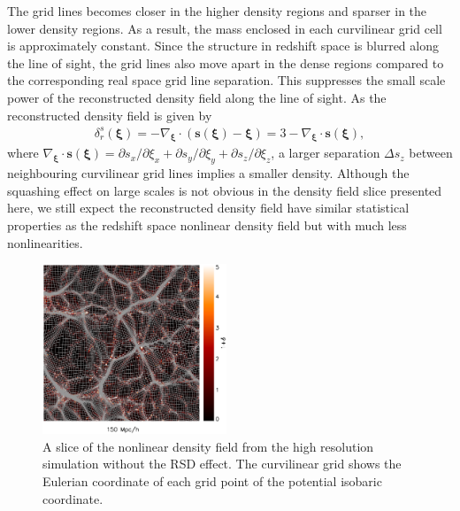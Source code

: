 \documentclass[aps,prx,twocolumn,superscriptaddress,groupedaddress,nofootinbib,amsfont]{revtex4}  %
\newcommand{\bea}{\begin{eqnarray}}
\newcommand{\eea}{\end{eqnarray}}
\newcommand{\bms}{\bm{s}}
\newcommand{\bmxi}{\bm{\xi}}
\begin{document}
The grid lines becomes closer in the higher density regions and sparser in the 
lower density regions. As a result, the mass enclosed in each curvilinear grid 
cell is approximately constant. Since the structure in redshift
space is blurred along the line of sight, the grid lines also move apart in the
dense regions compared to the corresponding real space grid line separation.
This suppresses the small scale power of the reconstructed density field 
along the line of sight.
As the reconstructed density field is given by 
\bea
\delta_r^s(\bmxi)=-\nabla_{\bmxi}\cdot(\bms(\bmxi)-\bmxi)=3-\nabla_{\bmxi}\cdot\bms(\bmxi),
\eea
where $\nabla_{\bmxi}\cdot\bms(\bmxi)=\partial s_x/\partial\xi_x+\partial s_y/\partial\xi_y+\partial s_z/\partial\xi_z$, a larger separation $\Delta s_z$ 
between neighbouring curvilinear grid lines implies a smaller density.
Although the squashing effect on large scales is not obvious in the density
field slice presented here, we still expect the reconstructed density field 
have similar statistical properties as the redshift space nonlinear density 
field but with much less nonlinearities.

\begin{figure}[tbp]
\begin{center}
\includegraphics[width=0.49\textwidth]{map0512-0128_i1500_xz222.eps}
\end{center}
\vspace{-0.7cm}
\caption{A slice of the nonlinear density field from the high resolution 
    simulation without the RSD effect. The curvilinear grid shows the Eulerian
    coordinate of each grid point of the potential isobaric coordinate.}
\label{fig:map}
\end{figure}
\end{document}
